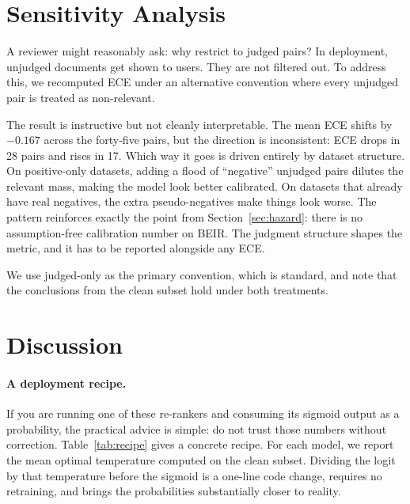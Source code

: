 \section{Sensitivity Analysis}
\label{sec:sensitivity}

A reviewer might reasonably ask: why restrict to judged pairs? In deployment,
unjudged documents get shown to users. They are not filtered out. To address this,
we recomputed ECE under an alternative convention where every unjudged pair is
treated as non-relevant.

The result is instructive but not cleanly interpretable. The mean ECE shifts by
$-0.167$ across the forty-five pairs, but the direction is inconsistent: ECE drops in
28 pairs and rises in 17. Which way it goes is driven entirely by dataset structure.
On positive-only datasets, adding a flood of ``negative'' unjudged pairs dilutes the
relevant mass, making the model look better calibrated. On datasets that already have
real negatives, the extra pseudo-negatives make things look worse. The pattern
reinforces exactly the point from Section~\ref{sec:hazard}: there is no
assumption-free calibration number on BEIR. The judgment structure shapes the
metric, and it has to be reported alongside any ECE.

We use judged-only as the primary convention, which is standard, and note that the
conclusions from the clean subset hold under both treatments.

\section{Discussion}
\label{sec:discussion}

\paragraph{A deployment recipe.}
If you are running one of these re-rankers and consuming its sigmoid output as a
probability, the practical advice is simple: do not trust those numbers without
correction. Table~\ref{tab:recipe} gives a concrete recipe. For each model, we
report the mean optimal temperature computed on the clean subset. Dividing the logit
by that temperature before the sigmoid is a one-line code change, requires no
retraining, and brings the probabilities substantially closer to reality.

